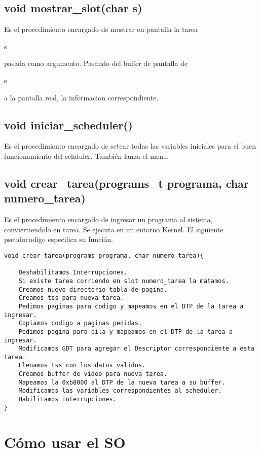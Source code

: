 \documentclass[a4paper,10pt]{article}
\begin{document}
\subsection*{void mostrar\_slot(char s)}
Es el procedimiento encargado de mostrar en pantalla la tarea \begin{it}s\end{it} pasada como argumento. Pasando del buffer de pantalla de \begin{it}s\end{it} a la pantalla real, la informacion correspondiente.

\subsection*{void iniciar\_scheduler()}
Es el procedimiento encargado de setear todas las variables iniciales para el buen funcionamiento del schduler. También lanza el menu.

\subsection*{void crear\_tarea(programs\_t programa, char numero\_tarea)}
Es el procedimiento encargado de ingresar un programa al sistema, conviertiendolo en tarea. Se ejecuta en un entorno Kernel.
El siguiente pseudocodigo especifica su función.
\begin{verbatim}
void crear_tarea(programs programa, char numero_tarea){
    
    Deshabilitamos Interrupciones.
    Si existe tarea corriendo en slot numero_tarea la matamos.
    Creamos nuevo directorio tabla de pagina.
    Creamos tss para nueva tarea.
    Pedimos paginas para codigo y mapeamos en el DTP de la tarea a ingresar.
    Copiamos codigo a paginas pedidas.
    Pedimos pagina para pila y mapeamos en el DTP de la tarea a ingresar.
    Modificamos GDT para agregar el Descriptor correspondiente a esta tarea.
    Llenamos tss con los datos validos.
    Creamos buffer de video para nueva tarea.
    Mapeamos la 0xb8000 al DTP de la nueva tarea a su buffer.
    Modificamos las variables correspondientes al scheduler.
    Habilitamos interrupciones.
}
\end{verbatim}


\section*{C\'omo usar el SO}
\end{document}
